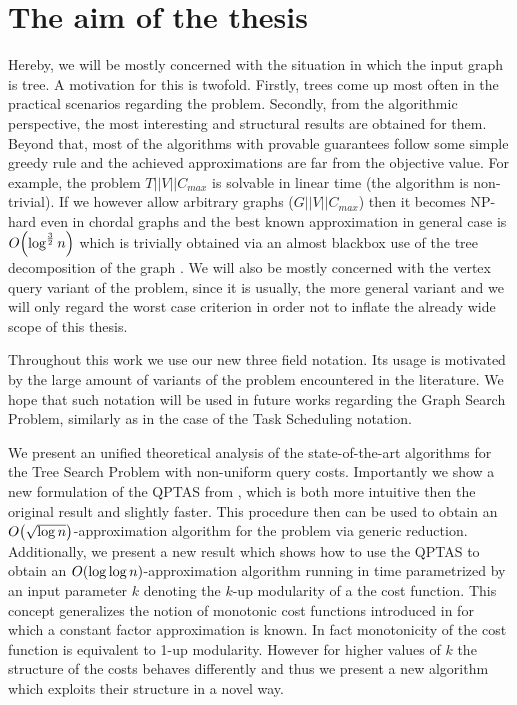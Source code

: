 \section{The aim of the thesis}

Hereby, we will be mostly concerned with the situation in which the input graph is tree. A motivation for this is twofold. Firstly, trees come up most often in the practical scenarios regarding the problem. Secondly, from the algorithmic perspective, the most interesting and structural results are obtained for them. Beyond that, most of the algorithms with provable guarantees follow some simple greedy rule and the achieved approximations are far from the objective value. For example, the problem $T||V||C_{max}$ is solvable in linear time (the algorithm is non-trivial)\cite{Schaffer1989OptNodeRankOfTsInLinTime}. If we however allow arbitrary graphs ($G||V||C_{max}$) then it becomes NP-hard even in chordal graphs \cite{DereniowskiVxRankOfChGsAndWTs} and the best known approximation in general case is $O\mathopen{}\left( \log^{\frac{3}{2}} n  \right)$ which is trivially obtained via an almost blackbox use of the tree decomposition of the graph \cite{RankingsofGraphs}. We will also be mostly concerned with the vertex query variant of the problem, since it is usually, the more general variant and we will only regard the worst case criterion in order not to inflate the already wide scope of this thesis.

Throughout this work we use our new three field notation. Its usage is motivated by the large amount of variants of the problem encountered in the literature. We hope that such notation will be used in future works regarding the Graph Search Problem, similarly as in the case of the Task Scheduling notation.

We present an unified theoretical analysis of the state-of-the-art algorithms for the Tree Search Problem with non-uniform query costs. Importantly we show a new formulation of the QPTAS from \cite{dereniowski2017ApproxSsForGeneralBSinWTs}, which is both more intuitive then the original result and slightly faster. This procedure then can be used to obtain an $O\mathopen{}\left( \sqrt{\log n} \right)$-approximation algorithm for the problem via generic reduction. Additionally, we present a new result which shows how to use the QPTAS to obtain an $O\mathopen{}\left( \log \log n \right)$-approximation algorithm running in time parametrized by an input parameter $k$ denoting the $k$-up modularity of a the cost function. This concept generalizes the notion of monotonic cost functions introduced in \cite{dereniowski2022CFApproxAlgForBSInTsWithMonoQTimes, dereniowski2024SInTsMonoQTs} for which a constant factor approximation is known. In fact monotonicity of the cost function is equivalent to 1-up modularity. However for higher values of $k$ the structure of the costs behaves differently and thus we present a new algorithm which exploits their structure in a novel way.

